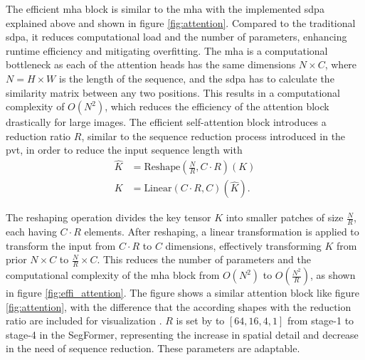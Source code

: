 The efficient \gls{mha} block is similar to the \gls{mha} with the implemented \gls{sdpa} explained above and shown in figure \ref{fig:attention}. Compared to the traditional \gls{sdpa}, it reduces computational load and the number of parameters, enhancing runtime efficiency and mitigating overfitting. The \gls{mha} is a computational bottleneck as each of the attention heads has the same dimensions \( N \times C \), where \( N = H \times W \) is the length of the sequence, and the \gls{sdpa} has to calculate the similarity matrix between any two positions. This results in a computational complexity of \( O(N^2) \), which reduces the efficiency of the attention block drastically for large images. The efficient self-attention block introduces a reduction ratio \( R \), similar to the sequence reduction process introduced in the \gls{pvt}, in order to reduce the input sequence length with 
\begin{equation}
    \begin{aligned}
        \hat{K} &= \text{Reshape}\left(\frac{N}{R}, C \cdot R\right) (K) \\
        K &= \text{Linear}\left(C \cdot R, C\right) (\hat{K}).
    \end{aligned}
\end{equation}

The reshaping operation divides the key tensor \( K \) into smaller patches of size \( \frac{N}{R} \), each having \( C \cdot R \) elements. After reshaping, a linear transformation is applied to transform the input from \( C \cdot R \) to \( C \) dimensions, effectively transforming \( K \) from prior \( N \times C \) to \( \frac{N}{R} \times C \). This reduces the number of parameters and the computational complexity of the \gls{mha} block from \( O(N^2) \) to \( O\left(\frac{N^2}{R}\right) \), as shown in figure \ref{fig:effi_attention}. The figure shows a similar attention block like figure \ref{fig:attention}, with the difference that the according shapes with the reduction ratio are included for visualization \autocite{Lin.Cheng.ea2023,Wang.Wang.ea2023,Xie.Wang.ea2021}. \( R \) is set by \textcite{Xie.Wang.ea2021} to \( [64, 16, 4, 1] \) from stage-1 to stage-4 in the SegFormer, representing the increase in spatial detail and decrease in the need of sequence reduction. These parameters are adaptable.

